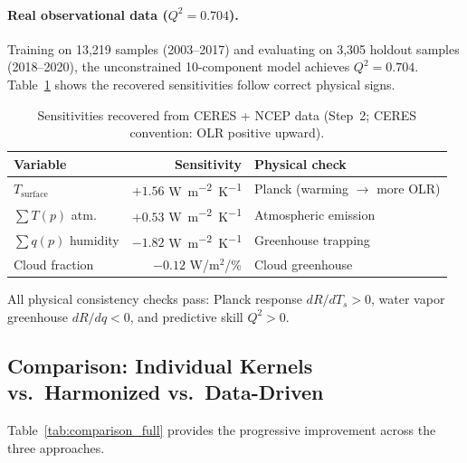 \documentclass[11pt]{article}
\newcommand{\WmsqK}{\si{W.m^{-2}.K^{-1}}}
\newcommand{\Qsq}{Q^{2}}
\begin{document}
\paragraph{Real observational data ($\Qsq = 0.704$).}
Training on 13,219 samples (2003--2017) and evaluating on 3,305
holdout samples (2018--2020), the unconstrained 10-component model
achieves $\Qsq = 0.704$. Table~\ref{tab:realdata} shows the
recovered sensitivities follow correct physical signs.

\begin{table}[t]
\centering
\caption{Sensitivities recovered from CERES + NCEP data
(Step~2; CERES convention: OLR positive upward).}
\label{tab:realdata}
\small
\begin{tabular}{@{}lrl@{}}
\toprule
\textbf{Variable} & \textbf{Sensitivity} & \textbf{Physical check} \\
\midrule
$T_\text{surface}$ & $+1.56$ \WmsqK{} & Planck (warming $\to$ more OLR) \\
$\sum T(p)$ atm. & $+0.53$ \WmsqK{} & Atmospheric emission \\
$\sum q(p)$ humidity & $-1.82$ \WmsqK{} & Greenhouse trapping \\
Cloud fraction & $-0.12$ W/m$^2$/\% & Cloud greenhouse \\
\bottomrule
\end{tabular}
\end{table}

All physical consistency checks pass: Planck response
$dR/dT_s > 0$, water vapor greenhouse $dR/dq < 0$, and
predictive skill $\Qsq > 0$.

\subsection{Comparison: Individual Kernels vs.\ Harmonized
  vs.\ Data-Driven}

Table~\ref{tab:comparison_full} provides the progressive
improvement across the three approaches.
\end{document}
